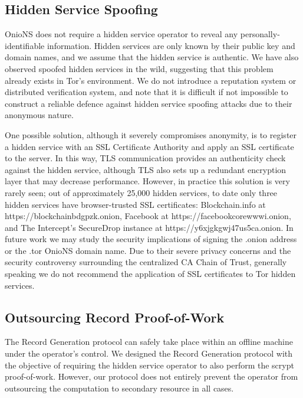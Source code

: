 \subsection{Hidden Service Spoofing}

OnioNS does not require a hidden service operator to reveal any personally-identifiable information. Hidden services are only known by their public key and domain names, and we assume that the hidden service is authentic. We have also observed spoofed hidden services in the wild, suggesting that this problem already exists in Tor's environment. We do not introduce a reputation system or distributed verification system, and note that it is difficult if not impossible to construct a reliable defence against hidden service spoofing attacks due to their anonymous nature. 

One possible solution, although it severely compromises anonymity, is to register a hidden service with an SSL Certificate Authority and apply an SSL certificate to the server. In this way, TLS communication provides an authenticity check against the hidden service, although TLS also sets up a redundant encryption layer that may decrease performance. However, in practice this solution is very rarely seen; out of approximately 25,000 hidden services,\cite{TorMetrics}\cite{kadianakis2015extrapolating} to date only three hidden services have browser-trusted SSL certificates: Blockchain.info at https://blockchainbdgpzk.onion, Facebook at https://facebookcorewwwi.onion, and The Intercept's SecureDrop instance at https://y6xjgkgwj47us5ca.onion. In future work we may study the security implications of signing the .onion address or the .tor OnioNS domain name. Due to their severe privacy concerns and the security controversy surrounding the centralized CA Chain of Trust, generally speaking we do not recommend the application of SSL certificates to Tor hidden services. 

\subsection{Outsourcing Record Proof-of-Work}


The Record Generation protocol can safely take place within an offline machine under the operator's control. We designed the Record Generation protocol with the objective of requiring the hidden service operator to also perform the scrypt proof-of-work. However, our protocol does not entirely prevent the operator from outsourcing the computation to secondary resource in all cases.

